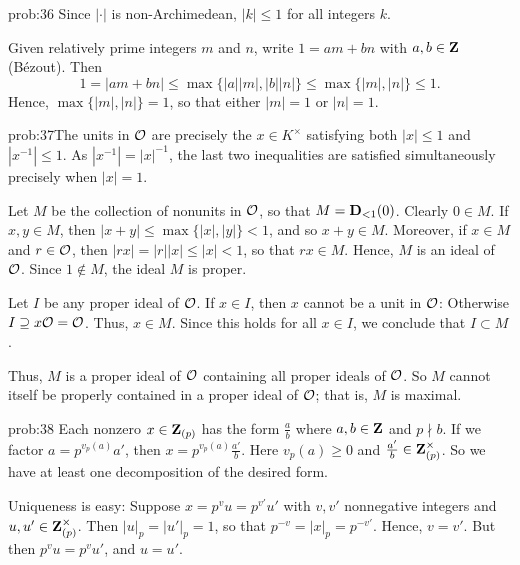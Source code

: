 \begin{sol}{prob:36} Since $|\cdot|$ is non-Archimedean, $|k| \le 1$ for all integers $k$. 

Given relatively prime integers $m$ and $n$, write $1 = am + bn$ with $a, b \in \mathbf{Z}$ (Bézout). Then 
\[ 1 = |am+bn| \le \max\{|a||m|, |b||n|\} \le \max\{|m|, |n|\} \le 1. \]
Hence, $\max\{|m|,|n|\}=1$, so that either $|m|=1$ or $|n|=1$.
\end{sol}

\begin{sol}{prob:37}The units in $\mathcal{O}$ are precisely the $x \in K^{\times}$ satisfying both $|x|\le 1$ and $|x^{-1}|\le 1$. As $|x^{-1}| = |x|^{-1}$, the last two inequalities are satisfied simultaneously precisely when $|x|=1$.

Let $M$ be the collection of nonunits in $\mathcal{O}$, so that $M = \mathbf{D}_{<1}(0)$. Clearly $0 \in M$. If $x, y \in M$, then $|x+y| \le \max\{|x|, |y|\} < 1$, and so $x+y \in M$. Moreover, if $x \in M$ and $r \in \mathcal{O}$, then $|rx| = |r| |x| \le |x| < 1$, so that $rx \in M$. Hence, $M$ is an ideal of $\mathcal{O}$. Since $1\notin M$, the ideal $M$ is proper.

Let $I$ be any proper ideal of $\mathcal{O}$. If $x \in I$, then $x$ cannot be a unit in $\mathcal{O}$: Otherwise $I\supseteq x\mathcal{O}=\mathcal{O}$. Thus, $x \in M$. Since this holds for all $x \in I$, we conclude that $I \subset M$.

Thus, $M$ is a proper ideal of $\mathcal{O}$ containing all proper ideals of $\mathcal{O}$. So $M$ cannot itself be properly contained in a proper ideal of $\mathcal{O}$; that is, $M$ is maximal.
\end{sol}

\begin{sol}{prob:38} Each nonzero $x \in \mathbf{Z}_{(p)}$ has the form $\frac{a}{b}$ where $a, b \in \mathbf{Z}$ and $p\nmid b$. If we factor $a = p^{v_p(a)} a'$, then $x = p^{v_p(a)} \frac{a'}{b}$. Here $v_p(a)\ge 0$ and $\frac{a'}{b} \in \mathbf{Z}_{(p)}^{\times}$. So we have at least one decomposition of the desired form. 

Uniqueness is easy: Suppose $x = p^v u = p^{v'} u'$ with $v,v'$ nonnegative integers and $u,u' \in \mathbf{Z}_{(p)}^{\times}$. Then $|u|_p=|u'|_p=1$, so that $p^{-v} = |x|_p = p^{-v'}$. Hence, $v=v'$. But then $p^v u = p^{v} u'$, and $u=u'$.
\end{sol}

